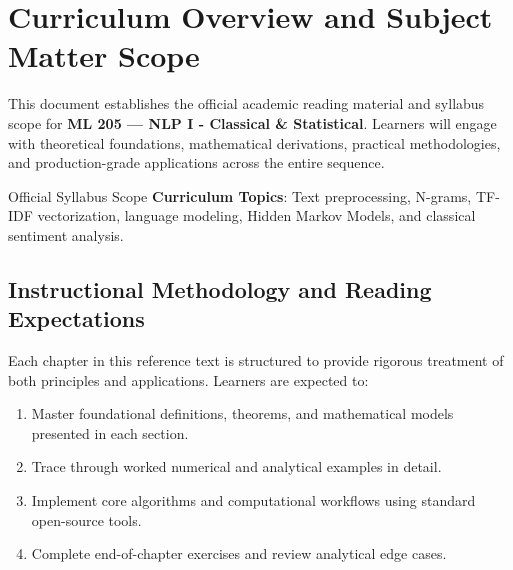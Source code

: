\section{Curriculum Overview and Subject Matter Scope}

This document establishes the official academic reading material and syllabus scope for \textbf{ML 205 --- NLP I - Classical \& Statistical}. Learners will engage with theoretical foundations, mathematical derivations, practical methodologies, and production-grade applications across the entire sequence.

\begin{InsightBox}{Official Syllabus Scope}
  \textbf{Curriculum Topics}: Text preprocessing, N-grams, TF-IDF vectorization, language modeling, Hidden Markov Models, and classical sentiment analysis.
\end{InsightBox}

\subsection{Instructional Methodology and Reading Expectations}

Each chapter in this reference text is structured to provide rigorous treatment of both principles and applications. Learners are expected to:
\begin{enumerate}
  \item Master foundational definitions, theorems, and mathematical models presented in each section.
  \item Trace through worked numerical and analytical examples in detail.
  \item Implement core algorithms and computational workflows using standard open-source tools.
  \item Complete end-of-chapter exercises and review analytical edge cases.
\end{enumerate}

